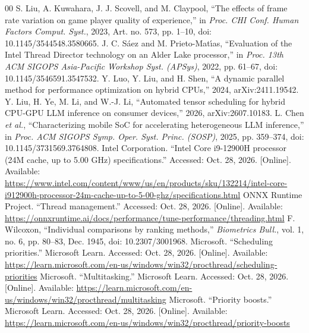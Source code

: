 \documentclass[conference]{IEEEtran}
\begin{document}
\begin{thebibliography}{00}
 S. Liu, A. Kuwahara, J. J. Scovell, and M. Claypool, ``The effects of frame rate variation on game player quality of experience,'' in \textit{Proc. CHI Conf. Human Factors Comput. Syst.}, 2023, Art. no. 573, pp. 1--10, doi: 10.1145/3544548.3580665.
 J. C. S\'{a}ez and M. Prieto-Mat\'{\i}as, ``Evaluation of the Intel Thread Director technology on an Alder Lake processor,'' in \textit{Proc. 13th ACM SIGOPS Asia-Pacific Workshop Syst. (APSys)}, 2022, pp. 61--67, doi: 10.1145/3546591.3547532.
 Y. Luo, Y. Liu, and H. Shen, ``A dynamic parallel method for performance optimization on hybrid CPUs,'' 2024, arXiv:2411.19542.
 Y. Liu, H. Ye, M. Li, and W.-J. Li, ``Automated tensor scheduling for hybrid CPU-GPU LLM inference on consumer devices,'' 2026, arXiv:2607.10183.
 L. Chen \textit{et al.}, ``Characterizing mobile SoC for accelerating heterogeneous LLM inference,'' in \textit{Proc. ACM SIGOPS Symp. Oper. Syst. Princ. (SOSP)}, 2025, pp. 359--374, doi: 10.1145/3731569.3764808.
 Intel Corporation. ``Intel Core i9-12900H processor (24M cache, up to 5.00 GHz) specifications.'' Accessed: Oct. 28, 2026. [Online]. Available: \url{https://www.intel.com/content/www/us/en/products/sku/132214/intel-core-i912900h-processor-24m-cache-up-to-5-00-ghz/specifications.html}
 ONNX Runtime Project. ``Thread management.'' Accessed: Oct. 28, 2026. [Online]. Available: \url{https://onnxruntime.ai/docs/performance/tune-performance/threading.html}
 F. Wilcoxon, ``Individual comparisons by ranking methods,'' \textit{Biometrics Bull.}, vol. 1, no. 6, pp. 80--83, Dec. 1945, doi: 10.2307/3001968.
 Microsoft. ``Scheduling priorities.'' Microsoft Learn. Accessed: Oct. 28, 2026. [Online]. Available: \url{https://learn.microsoft.com/en-us/windows/win32/procthread/scheduling-priorities}
 Microsoft. ``Multitasking.'' Microsoft Learn. Accessed: Oct. 28, 2026. [Online]. Available: \url{https://learn.microsoft.com/en-us/windows/win32/procthread/multitasking}
 Microsoft. ``Priority boosts.'' Microsoft Learn. Accessed: Oct. 28, 2026. [Online]. Available: \url{https://learn.microsoft.com/en-us/windows/win32/procthread/priority-boosts}
\end{thebibliography}
\end{document}
